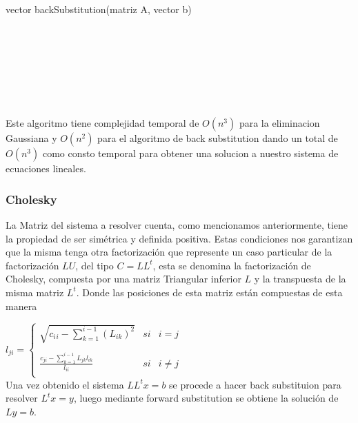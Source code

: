 \begin{algorithm}
    \begin{algorithmic}[1]\parskip=2mm
        \caption{vector backSubstitution(matriz A, vector b)}
        \\
        \\
        \\
        \\
        \\
        \\
    \end{algorithmic}
\end{algorithm}

Este algoritmo tiene complejidad temporal de $O(n^{3})$ para la eliminacion Gaussiana y $O(n^{2})$ para el algoritmo de back substitution dando un total de $O(n^{3})$ como consto temporal para obtener una solucion a nuestro sistema de ecuaciones lineales.

\newpage
\subsubsection{Cholesky}
La Matriz del sistema a resolver cuenta, como mencionamos anteriormente, tiene la propiedad de ser simétrica y definida positiva. Estas condiciones nos garantizan que la misma tenga otra factorización que represente un caso particular de la factorización $LU$, del tipo $C=LL^{t}$, esta se denomina la factorización de Cholesky, compuesta por una matriz Triangular inferior $L$ y la transpuesta de la misma matriz $L^{t}$. Donde las posiciones de esta matriz están compuestas de esta manera

$l_{ji} =
\left\{
    \begin{array}{lcc}
        \sqrt{c{_i}{_i} - \sum\limits_{k=1}^{i-1} (L_{ik})^2} & si & i = j \\
        \\ \frac{c_{ji} - \sum\limits_{k=1}^{i-1} L_{jk}l_{ik}}{l_{ii}} & si & i \neq j \\
    \end{array}
\right.$ \\

Una vez obtenido el sistema $LL^tx=b$ se procede a hacer back substituion para resolver $L^tx=y$, luego mediante forward substitution se obtiene la solución de $Ly=b$.

